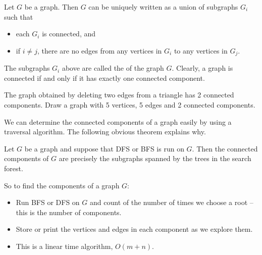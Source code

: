 \begin{Theorem} \label{thm:components}
Let $G$ be a graph. Then $G$ can be uniquely written as a union of
subgraphs $G_i$ such that
\begin{itemize}
  \item each $G_i$ is connected, and
  \item if $i \neq j$, there are no edges from any vertices in $G_i$ 
  to any vertices in $G_j$.
\end{itemize}
\end{Theorem}

The subgraphs $G_i$ above are called the  of the graph $G$. 
Clearly, a graph is connected if and only if it has exactly one connected component.

\begin{Boxample}[3] \label{eg:components}
The graph obtained by deleting two edges from a triangle has 2 connected components. Draw a graph with 5 vertices, 5 edges and 2 connected components.
\end{Boxample}

We can determine the connected components of a graph easily by using a
traversal algorithm. The following obvious theorem explains why.

\begin{Theorem} \label{thm:trav-comps}
Let $G$ be a graph and suppose that DFS or BFS is run on $G$. Then the
connected components of $G$ are precisely the subgraphs spanned by the
trees in the search forest. 
\end{Theorem}

So to find the components of a graph $G$:
\begin{itemize}
\item Run BFS or DFS on $G$ and count of the number of times we choose a root -- this is the number of components.
\item Store or print the vertices and edges in each component as we explore them.
\item This is a linear time algorithm, $O(m+n)$.
\end{itemize}

